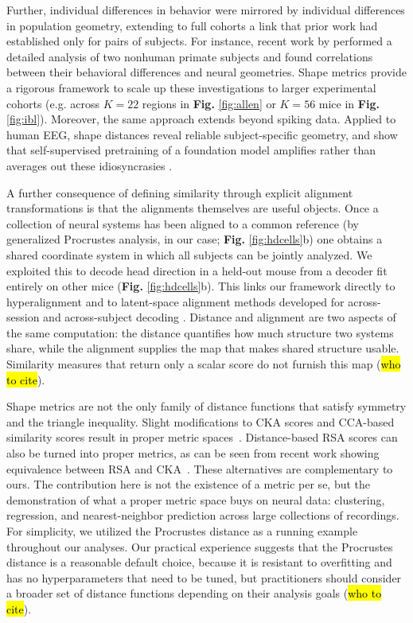 Further, individual differences in behavior were mirrored by individual differences in population geometry, extending to full cohorts a link that prior work had established only for pairs of subjects.
For instance, recent work by \textcite{fascianelli2024neural} performed a detailed analysis of two nonhuman primate subjects and found correlations between their behavioral differences and neural geometries.
Shape metrics provide a rigorous framework to scale up these investigations to larger experimental cohorts (e.g. across $K = 22$ regions in \textbf{Fig.} \ref{fig:allen} or $K = 56$ mice in \textbf{Fig.} \ref{fig:ibl}). Moreover, the same approach extends beyond spiking data. Applied to human EEG, shape distances reveal reliable subject-specific geometry, and show that self-supervised pretraining of a foundation model \parencite{cui2024,wang2025} amplifies rather than averages out these idiosyncrasies \parencite{marty2026}.

A further consequence of defining similarity through explicit alignment transformations is that the alignments themselves are useful objects.
Once a collection of neural systems has been aligned to a common reference (by generalized Procrustes analysis, in our case; \textbf{Fig.} \ref{fig:hdcells}b) one obtains a shared coordinate system in which all subjects can be jointly analyzed.
We exploited this to decode head direction in a held-out mouse from a decoder fit entirely on other mice (\textbf{Fig.} \ref{fig:hdcells}b).
This links our framework directly to hyperalignment \parencite{haxby2020hyperalignment, Chen2021} and to latent-space alignment methods developed for across-session \parencite{degenhart2020stabilization, gallego2020long} and across-subject decoding \parencite{safaie2023preserved}. 
Distance and alignment are two aspects of the same computation: the distance quantifies how much structure two systems share, while the alignment supplies the map that makes shared structure usable.
Similarity measures that return only a scalar score do not furnish this map (\hl{who to cite}).

Shape metrics are not the only family of distance functions that satisfy symmetry and the triangle inequality.
Slight modifications to CKA scores and CCA-based similarity scores result in proper metric spaces~\parencite{Williams2021}.
Distance-based RSA scores can also be turned into proper metrics, as can be seen from recent work showing equivalence between RSA and CKA~\parencite{Williams2024}. These alternatives are complementary to ours. The contribution here is not the existence of a metric per se, but the demonstration of what a proper metric space buys on neural data: clustering, regression, and nearest-neighbor prediction across large collections of recordings.
 For simplicity, we utilized the Procrustes distance as a running example throughout our analyses.
Our practical experience suggests that the Procrustes distance is a reasonable default choice, because it is resistant to overfitting and has no hyperparameters that need to be tuned, but practitioners should consider a broader set of distance functions depending on their analysis goals (\hl{who to cite}).

